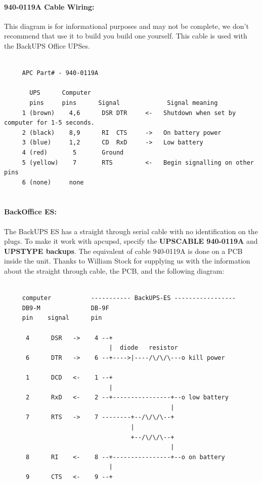 {{{{{{{{{{\label{940_002d0119A-Cable-Wiring}

\paragraph*{940-0119A Cable Wiring:}

\label{index-Cables-208}
This diagram is for informational purposes and may not be complete, we don't
recommend that use it to build you build one yourself. This cable is used with
the BackUPS Office UPSes. 

\footnotesize
\begin{verbatim}
     
     APC Part# - 940-0119A
     
       UPS      Computer
       pins     pins      Signal             Signal meaning
     1 (brown)    4,6      DSR DTR     <-   Shutdown when set by computer for 1-5 seconds.
     2 (black)    8,9      RI  CTS     ->   On battery power
     3 (blue)     1,2      CD  RxD     ->   Low battery
     4 (red)       5       Ground
     5 (yellow)    7       RTS         <-   Begin signalling on other pins
     6 (none)     none
     
\end{verbatim}
\normalsize

\label{BackOffice-ES}

\paragraph*{BackOffice ES:}

\label{index-Cables-209}
\label{index-BackOffice-ES-210}
The BackUPS ES has a straight through serial cable with no identification on
the plugs. To make it work with apcupsd, specify the {\bf UPSCABLE 940-0119A}
and {\bf UPSTYPE backups}.  The equivalent of cable 940-0119A is done on a PCB
inside the unit.  Thanks to William Stock for supplying us with the
information about the straight through cable, the PCB, and the following
diagram: 

\footnotesize
\begin{verbatim}
     
     computer           ----------- BackUPS-ES -----------------
     DB9-M              DB-9F
     pin    signal      pin
     
      4      DSR   ->    4 --+
                             |  diode   resistor
      6      DTR   ->    6 --+---->|----/\/\/\---o kill power
     
      1      DCD   <-    1 --+
                             |
      2      RxD   <-    2 --+----------------+--o low battery
                                              |
      7      RTS   ->    7 --------+--/\/\/\--+
                                   |
                                   +--/\/\/\--+
                                              |
      8      RI    <-    8 --+----------------+--o on battery
                             |
      9      CTS   <-    9 --+
     

\end{verbatim}}}}}}}}}}}
